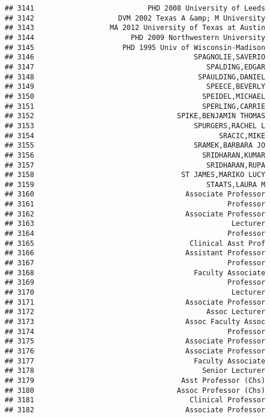 \documentclass[
]{article}
\begin{document}
\begin{verbatim}
## 3141                           PHD 2008 University of Leeds
## 3142                    DVM 2002 Texas A &amp; M University
## 3143                  MA 2012 University of Texas at Austin
## 3144                       PHD 2009 Northwestern University
## 3145                     PHD 1995 Univ of Wisconsin-Madison
## 3146                                      SPAGNOLIE,SAVERIO
## 3147                                         SPALDING,EDGAR
## 3148                                       SPAULDING,DANIEL
## 3149                                         SPEECE,BEVERLY
## 3150                                        SPEIDEL,MICHAEL
## 3151                                        SPERLING,CARRIE
## 3152                                  SPIKE,BENJAMIN THOMAS
## 3153                                      SPURGERS,RACHEL L
## 3154                                            SRACIC,MIKE
## 3155                                      SRAMEK,BARBARA JO
## 3156                                        SRIDHARAN,KUMAR
## 3157                                         SRIDHARAN,RUPA
## 3158                                   ST JAMES,MARIKO LUCY
## 3159                                         STAATS,LAURA M
## 3160                                    Associate Professor
## 3161                                              Professor
## 3162                                    Associate Professor
## 3163                                               Lecturer
## 3164                                              Professor
## 3165                                     Clinical Asst Prof
## 3166                                    Assistant Professor
## 3167                                              Professor
## 3168                                      Faculty Associate
## 3169                                              Professor
## 3170                                               Lecturer
## 3171                                    Associate Professor
## 3172                                         Assoc Lecturer
## 3173                                    Assoc Faculty Assoc
## 3174                                              Professor
## 3175                                    Associate Professor
## 3176                                    Associate Professor
## 3177                                      Faculty Associate
## 3178                                        Senior Lecturer
## 3179                                   Asst Professor (Chs)
## 3180                                  Assoc Professor (Chs)
## 3181                                     Clinical Professor
## 3182                                    Associate Professor

\end{verbatim}
\end{document}
